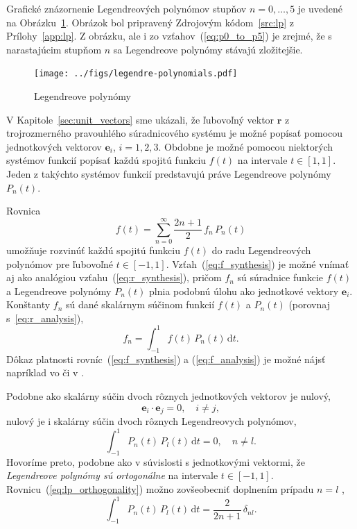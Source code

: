 \documentclass[a4paper, 12pt]{book}
\newcommand{\diff}{\mathrm d}
\let\vec\mathbf
\begin{document}
Grafické znázornenie Legendreových polynómov stupňov $n =0, \dots, 5$ je 
uvedené na Obrázku~\ref{fig:lp}.  Obrázok bol pripravený Zdrojovým 
kódom~\ref{src:lp} z Prílohy~\ref{app:lp}.  Z obrázku, ale i zo 
vzťahov~(\ref{eq:p0_to_p5}) je zrejmé, že s narastajúcim stupňom $n$ sa 
Legendreove polynómy stávajú zložitejšie.

\begin{figure}[bt]
\label{fig:lp}
\centering
\texttt{[image: ../figs/legendre-polynomials.pdf]}
\caption{Legendreove polynómy}
\end{figure}

V Kapitole~\ref{sec:unit_vectors} sme ukázali, že ľubovoľný vektor $\vec r$ 
z trojrozmerného pravouhlého súradnicového systému je možné popísať pomocou 
jednotkových vektorov $\vec e_i$, $i = 1, 2, 3$.  Obdobne je možné pomocou 
niektorých systémov funkcií popísať každú spojitú funkciu $f(t)$ na intervale 
$t \in [1, 1]$.  Jeden z takýchto systémov funkcií predstavujú práve 
Legendreove polynómy~$P_n(t)$.

Rovnica
%
\begin{equation}
\label{eq:f_synthesis}
f(t) = \sum_{n = 0}^\infty \frac{2n + 1}{2} \, f_n \, P_n(t)
\end{equation}
%
umožňuje rozvinúť každú spojitú funkciu $f(t)$ do radu Legendreových polynómov 
pre ľubovoľné $t \in [-1, 1]$.  Vzťah~(\ref{eq:f_synthesis}) je možné vnímať aj 
ako analógiou vzťahu~(\ref{eq:r_synthesis}), pričom $f_n$ sú súradnice funkcie 
$f(t)$ a Legendreove polynómy $P_n(t)$ plnia podobnú úlohu ako jednotkové 
vektory $\vec e_i$.  Konštanty $f_n$ sú dané skalárnym súčinom funkcií $f(t)$ 
a $P_n(t)$ (porovnaj s~\ref{eq:r_analysis}),
%
\begin{equation}
\label{eq:f_analysis}
f_n = \int_{-1}^1 f(t) \, P_n(t) \, \diff t{.}
\end{equation}
%
Dôkaz platnosti rovníc~(\ref{eq:f_synthesis}) a (\ref{eq:f_analysis}) je možné 
nájsť napríklad vo \cite{Freeden2009} či v \cite{SansoGeoidDetermination}.

Podobne ako skalárny súčin dvoch rôznych jednotkových vektorov je nulový,
%
\begin{equation}
\vec e_i \cdot \vec e_j = 0{,} \quad i \neq j{,}
\end{equation}
%
nulový je i skalárny súčin dvoch rôznych Legendreovych polynómov,
%
\begin{equation}
\label{eq:lp_orthogonality}
\int_{-1}^1 P_n(t) \, P_l(t) \, \diff t = 0{,} \quad n \neq l{.}
\end{equation}
%
Hovoríme preto, podobne ako v súvislosti s jednotkovými vektormi, že 
\emph{Legendreove polynómy sú ortogonálne} na intervale $t \in [-1, 1].$  
Rovnicu~(\ref{eq:lp_orthogonality}) možno zovšeobecniť doplnením prípadu $n 
= l$ \citep[napríklad][]{Hobson},
%
\begin{equation}
\label{eq:lp_orthogonality_2}
\int_{-1}^1 P_n(t) \, P_l(t) \, \diff t = \frac{2}{2n + 1} \, \delta_{nl}{.}
\end{equation}
\end{document}
